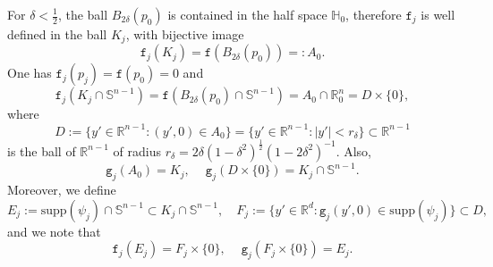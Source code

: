 \documentclass[10pt,reqno,a4paper]{article}
\numberwithin{equation}{section}
\theoremstyle{plain}
\theoremstyle{definition}
\newcommand{\R}{{\mathbb R}}
\renewcommand{\S}{{\mathbb S}}
\begin{document}
For $\delta < \frac12$, the ball $B_{2\delta}(p_0)$ is contained in the half space $\mathbb H_0$, 
therefore $\mathtt f_j$ is well defined in the ball $K_j$, 
with bijective image 
\[
\mathtt f_j(K_j) = \mathtt f(B_{2\delta}(p_0)) =: A_0.
\] 
One has $\mathtt f_j(p_j) = \mathtt f(p_0) = 0$ and 
\begin{equation} \label{ttf.j.K.j.cap.S.d}
\mathtt f_j(K_j \cap \S^{n-1}) 
= \mathtt f( B_{2\delta}(p_0) \cap \S^{n-1} )
= A_0 \cap \R^n_0
= D \times \{ 0 \}, 
\end{equation}
where 
\begin{equation} \label{def.disc.D}
D := \{ y' \in \R^{n-1} : (y',0) \in A_0 \}
= \{ y' \in \R^{n-1} : |y'| < r_{\delta} \} \subset \R^{n-1}
\end{equation}
is the ball of $\R^{n-1}$ of radius $r_{\delta} = 2 \delta (1 - \delta^2)^{\frac12} (1 - 2 \delta^2)^{-1}$.
Also, 
\begin{equation} \label{local.prop.ttg.j}
\mathtt g_j(A_0) = K_j, \quad \ 
\mathtt g_j(D \times \{0\}) = K_j \cap \S^{n-1}.
\end{equation}
Moreover, we define 
\begin{equation} 
E_j := \mathrm{supp}(\psi_j) \cap \S^{n-1} \subset K_j \cap \S^{n-1},
\quad 
F_j := \{ y' \in \R^d : \mathtt g_j(y',0) \in \mathrm{supp}(\psi_j) \} \subset D,
\label{def.compact.F.j}
\end{equation}
and we note that 
\begin{equation} \label{local.prop.ttg.j.E.j.F.j}
\mathtt f_j(E_j) = F_j  \times \{ 0 \}, \quad \ 
\mathtt g_j(F_j \times \{0\}) = E_j.
\end{equation}

\medskip
\end{document}
